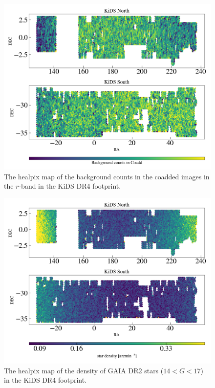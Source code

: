 \documentclass[fleqn,usenatbib,useAMS]{mnras}
\begin{document}
\begin{figure}
\includegraphics[width=\textwidth]{figures_tmp/sys/scatter_BackGr.png}
\caption{\label{fig:scatter_BackGr} The healpix map of the background counts in the coadded images in the $r$-band in the KiDS DR4 footprint.} 
\end{figure}

\begin{figure}
\includegraphics[width=\textwidth]{figures_tmp/sys/scatter_nstar.png}
\caption{\label{fig:scatter_stardens} The healpix map of the density of GAIA DR2 stars ($14<G<17$) in the KiDS DR4 footprint.} 
\end{figure}
\end{document}
